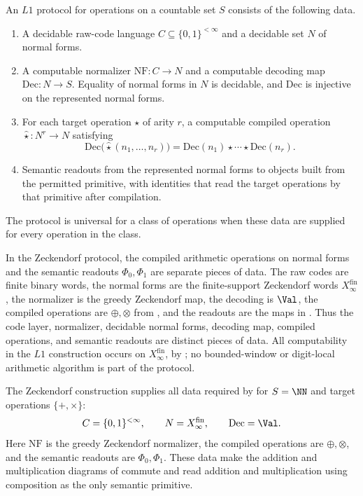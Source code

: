 \begin{definition}\label{def:prot-univ}
An \(L1\) protocol for operations on a countable set \(S\) consists of the
following data.
\begin{enumerate}
\item A decidable raw-code language \(C\subseteq\{0,1\}^{<\infty}\) and a
  decidable set \(N\) of normal forms.
\item A computable normalizer \(\mathrm{NF}\colon C\to N\) and a computable
  decoding map \(\mathrm{Dec}\colon N\to S\).  Equality of normal forms in \(N\)
  is decidable, and \(\mathrm{Dec}\) is injective on the represented normal
  forms.
\item For each target operation \(\star\) of arity \(r\), a computable compiled
  operation \(\widehat\star\colon N^r\to N\) satisfying
  \[
    \mathrm{Dec}\bigl(\widehat\star(n_1,\ldots,n_r)\bigr)
      =\mathrm{Dec}(n_1)\star\cdots\star\mathrm{Dec}(n_r).
  \]
\item Semantic readouts from the represented normal forms to objects built from
  the permitted primitive, with identities that read the target operations by
  that primitive after compilation.
\end{enumerate}
The protocol is universal for a class of operations when these data are supplied
for every operation in the class.
\end{definition}

In the Zeckendorf protocol, the compiled arithmetic operations on normal forms
and the semantic readouts \(\Phi_0,\Phi_1\) are separate pieces of data.  The
raw codes are finite binary words, the normal forms are the finite-support
Zeckendorf words \(X_\infty^{\mathrm{fin}}\), the normalizer is the greedy
Zeckendorf map, the decoding is \(\Val\), the compiled operations are
\(\oplus,\otimes\) from , and the readouts are the maps
in .  Thus the code layer, normalizer, decidable normal
forms, decoding map, compiled operations, and semantic readouts are distinct
pieces of data.  All computability in the \(L1\) construction occurs on
\(X_\infty^{\mathrm{fin}}\), by
; no
bounded-window or digit-local arithmetic algorithm is part of the protocol.

\begin{proposition}
\label{prop:zeckendorf-protocol-data}
The Zeckendorf construction supplies all data required by
 for \(S=\NN\) and target operations \(\{+,\times\}\):
\[
  C=\{0,1\}^{<\infty},\qquad
  N=X_\infty^{\mathrm{fin}},\qquad
  \mathrm{Dec}=\Val.
\]
Here \(\mathrm{NF}\) is the greedy Zeckendorf normalizer, the compiled operations
are \(\oplus,\otimes\), and the semantic readouts are \(\Phi_0,\Phi_1\).  These
data make the addition and multiplication diagrams of 
commute and read addition and multiplication using composition as the only
semantic primitive.
\end{proposition}

